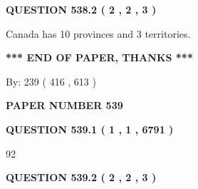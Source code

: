 \documentclass[12pt]{article}
\begin{document}
\vspace{0.2in}
  
{\textbf{\Large{QUESTION
538.2 
 ( 2 , 2 , 3 )
}}}
  
  
 
 
\noindent{}
 
 
Canada has 10  provinces and 3 territories.
 
 
 
 
   
   
 \vspace{0.2in}
 
   
   
   
   
\vspace{1.0in} 
{\textbf{\large{ *** END OF PAPER, THANKS *** }}} 
   
   
\hspace{1.0in} By: 
 239 ( 416 ,  613 )
   
   
   
   
\newpage 
\setcounter{page}{ 
   539001 } 
   
   
   
   
 {\textbf{ \Large{ PAPER NUMBER  539  }}}
   
   
\vspace{0.2in}
   
   
   
   
   
   
 \vspace{0.2in}
 
 
 
 
   
   
  
\vspace{0.2in}
  
{\textbf{\Large{QUESTION
539.1 
 ( 1 , 1 , 6791 )
}}}
  
  
 
 
\noindent{}

92
 
 
  
\vspace{0.2in}
  
{\textbf{\Large{QUESTION
539.2 
 ( 2 , 2 , 3 )
}}}
  
  
 
\end{document}
